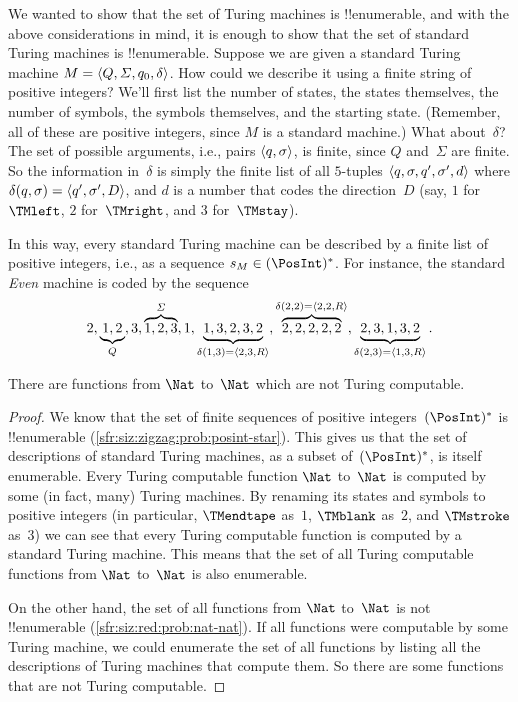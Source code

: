 \documentclass[../../../include/open-logic-section]{subfiles}
\begin{document}
\begin{explain}
We wanted to show that the set of Turing machines is !!{enumerable},
and with the above considerations in mind, it is enough to show that
the set of standard Turing machines is !!{enumerable}. Suppose we are
given a standard Turing machine $M = \langle Q, \Sigma, q_0, \delta \rangle$.
How could we describe it using a finite string of positive integers?
We'll first list the number of states, the states themselves, the
number of symbols, the symbols themselves, and the starting state.
(Remember, all of these are positive integers, since $M$ is a standard
machine.)  What about~$\delta$? The set of possible arguments, i.e.,
pairs $\langle q,\sigma \rangle$, is finite, since $Q$ and~$\Sigma$ are
finite. So the information in~$\delta$ is simply the finite list of
all $5$-tuples $\langle q, \sigma, q', \sigma', d \rangle$ where
$\delta(q,\sigma) = \langle q', \sigma', D \rangle$, and $d$ is a number that
codes the direction~$D$ (say, $1$ for~$\TMleft$, $2$ for~$\TMright$,
and $3$ for~$\TMstay$).

In this way, every standard Turing machine can be described by a
finite list of positive integers, i.e., as a sequence $s_M \in
(\PosInt)^*$. For instance, the standard \emph{Even} machine is coded
by the sequence
\[
2, \underbrace{1, 2}_Q, 3, \overbrace{1, 2, 3}^\Sigma, 1, \underbrace{1, 3, 2, 3, 2}_{\delta(1,3) = \langle 2,3,R \rangle}, 
\overbrace{2, 2, 2, 2, 2}^{\delta(2,2) = \langle 2,2,R \rangle},
\underbrace{2, 3, 1, 3, 2}_{\delta(2,3) = \langle 1,3,R \rangle}.
\]
\end{explain}

\begin{thm}
There are functions from $\Nat$ to~$\Nat$ which are not Turing
computable.
\end{thm}

\begin{proof}
We know that the set of finite sequences of positive
integers~$(\PosInt)^*$ is !!{enumerable}
(\cref{sfr:siz:zigzag:prob:posint-star}). This gives us that the set
of descriptions of standard Turing machines, as a subset
of~$(\PosInt)^*$, is itself enumerable.  Every Turing computable
function $\Nat$ to~$\Nat$ is computed by some (in fact, many) Turing
machines. By renaming its states and symbols to positive integers (in
particular, $\TMendtape$ as~$1$, $\TMblank$ as~$2$, and $\TMstroke$
as~$3$) we can see that every Turing computable function is computed
by a standard Turing machine. This means that the set of all Turing
computable functions from $\Nat$ to~$\Nat$ is also enumerable.

On the other hand, the set of all functions from $\Nat$ to~$\Nat$ is
not !!{enumerable} (\cref{sfr:siz:red:prob:nat-nat}). If all functions
were computable by some Turing machine, we could enumerate the set of
all functions by listing all the descriptions of Turing machines that
compute them. So there are some functions that are not Turing
computable. 
\end{proof}
\end{document}

